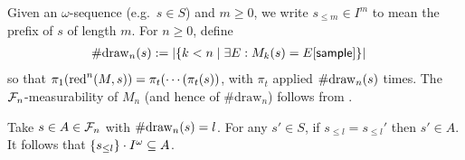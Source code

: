 Given an $\omega$-sequence (e.g.~$s \in S$) and $m \geq 0$, we write $s_{\leq m} \in I^m$ to mean the prefix of $s$ of length $m$.
For $n \geq 0$, define
\begin{align*}
\#\mathrm{draw}_{n}(s) &:= |\{k < n \mid \exists E: M_k(s) = E[\mathsf{sample}]\}|
\end{align*}
so that $\pi_1 (\red^n(M, s)) = %
\pi_t( \cdots (\pi_t (s))$, with $\pi_t$ applied ${\#\mathrm{draw}_{n}(s)}$ times.
The $\mathcal{F}_n$-measurability of $M_n$ (and hence of $\#\mathrm{draw}_n$) follows from \citep{DBLP:conf/icfp/BorgstromLGS16}.
\iffalse
\akr{$\#\mathrm{draw}_n$ is not a stopping time. It doesn't look like you actually use this claim anyway, so it should just be fine to remove, but did you mean something different?} \lo{I agree, and I don't actually use this claim.}
\fi
Take $s \in A \in \mathcal{F}_n$ with $\#\mathrm{draw}_{n}(s) = l$.
For any $s'\in S$, if $s_{\leq l} = s_{\leq l}'$ then $s' \in A$.
It follows that ${\{s_{\leq l}\} \cdot I^\omega} \subseteq A$.

\iffalse
\lo{We need to show that each $f(M_n)$ is integrable. LO claimed earlier that $0 \leq f(N) \leq f(M)$ for all $N \in \mathit{Rch}(M)$.
This is of false: take $f$ with $v \, \tsample \mapsto 1$ and $v \, \underline{r} \mapsto 2\, r$ for some value $v$. 
However, it is true that
\[
\int_{S} \mu(\dif s) \, |f(M_n)(s)| 
=
\int_{S} \mu(\dif s) \, f(M_n)(s)
\leq
\int_{S} \mu(\dif s) \, f(M_0)(s)
=
f(M)
\]
the inequality above follows from \Cref{lem:key rankable}.
}
\fi

